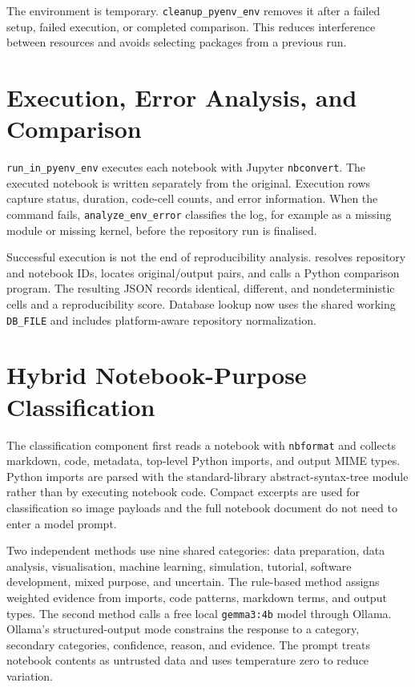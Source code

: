 The environment is temporary. \texttt{cleanup\_pyenv\_env} removes it after a failed setup, failed execution, or completed comparison. This reduces interference between resources and avoids selecting packages from a previous run.

\section{Execution, Error Analysis, and Comparison}

\texttt{run\_in\_pyenv\_env} executes each notebook with Jupyter \texttt{nbconvert}. The executed notebook is written separately from the original. Execution rows capture status, duration, code-cell counts, and error information. When the command fails, \texttt{analyze\_env\_error} classifies the log, for example as a missing module or missing kernel, before the repository run is finalised.

Successful execution is not the end of reproducibility analysis.  resolves repository and notebook IDs, locates original/output pairs, and calls a Python comparison program. The resulting JSON records identical, different, and nondeterministic cells and a reproducibility score. Database lookup now uses the shared working \texttt{DB\_FILE} and includes platform-aware repository normalization.

\section{Hybrid Notebook-Purpose Classification}

The classification component first reads a notebook with \texttt{nbformat} and collects markdown, code, metadata, top-level Python imports, and output MIME types. Python imports are parsed with the standard-library abstract-syntax-tree module rather than by executing notebook code. Compact excerpts are used for classification so image payloads and the full notebook document do not need to enter a model prompt.

Two independent methods use nine shared categories: data preparation, data analysis, visualisation, machine learning, simulation, tutorial, software development, mixed purpose, and uncertain. The rule-based method assigns weighted evidence from imports, code patterns, markdown terms, and output types. The second method calls a free local \texttt{gemma3:4b} model through Ollama. Ollama's structured-output mode constrains the response to a category, secondary categories, confidence, reason, and evidence. The prompt treats notebook contents as untrusted data and uses temperature zero to reduce variation.

